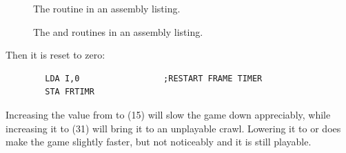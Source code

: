 \begin{figure}[H]
  \centering
  \caption{The  routine in an assembly listing.}
\end{figure}
\begin{figure}[H]
  \centering
  \caption{The  and  routines in an assembly listing.}
\end{figure}
\clearpage

Then it is reset to zero:
\begin{lstlisting}
        LDA I,0                 ;RESTART FRAME TIMER
        STA FRTIMR
\end{lstlisting}
Increasing the value from  to  (15) will slow the game down appreciably, while increasing
it to  (31) will bring it to an unplayable crawl. Lowering it to  or  does make the game slightly
faster, but not noticeably and it is still playable.


